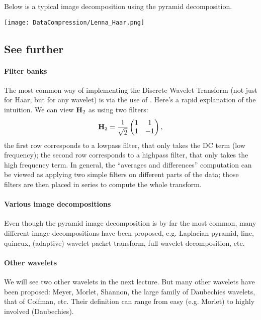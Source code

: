 \documentclass[a4paper, 11pt, openany]{book}
\begin{document}
Below is a typical image decomposition using the pyramid decomposition.

\begin{center}
    \texttt{[image: DataCompression/Lenna\_Haar.png]}
\end{center}


\subsection{See further}

\paragraph{Filter banks}
The most common way of implementing the Discrete Wavelet Transform (not just for Haar, but for any wavelet) is via the use of . Here's a rapid explanation of the intuition. We can view ${\bf H}_2$ as using two filters:
\[
    {\bf H}_2 = \frac{1}{\sqrt{2}} \begin{pmatrix}
    1 & 1\\
    1 & -1
    \end{pmatrix},
\]
the first row corresponds to a lowpass filter, that only takes the DC term (low frequency); the second row corresponds to a highpass filter, that only takes the high frequency term. In general, the ``averages and differences'' computation can be viewed as applying two simple filters on different parts of the data; those filters are then placed in series to compute the whole transform.

\paragraph{Various image decompositions}
Even though the pyramid image decomposition is by far the most common, many different image decompositions have been proposed, e.g. Laplacian pyramid, line, quincux, (adaptive) wavelet packet transform, full wavelet decomposition, etc.



\paragraph{Other wavelets}
We will see two other wavelets in the next lecture. But many other wavelets have been proposed: Meyer, Morlet, Shannon, the large family of Daubechies wavelets, that of Coifman, etc. Their definition can range from easy (e.g. Morlet) to highly involved (Daubechies).
\end{document}
